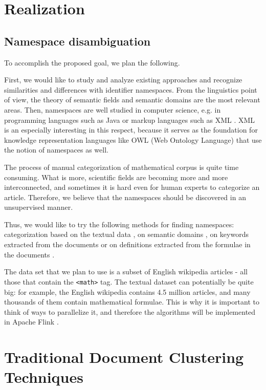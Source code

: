 

\section{Realization}
\subsection{Namespace disambiguation}

To accomplish the proposed goal, we plan the following.

First, we would like to study and analyze existing approaches and recognize similarities and differences with identifier namespaces. From the linguistics point of view, the theory of semantic fields \cite{vassilyev1974theory} and semantic domains \cite{gliozzo2009semantic} are the most relevant areas. Then, namespaces are well studied in computer science, e.g. in programming languages such as Java \cite{gosling2014java} or markup languages such as XML \cite{xmlnamespaces}. XML is an especially interesting in this respect, because it serves as the foundation for knowledge representation languages like OWL (Web Ontology Language) \cite{mcguinness2004owl} that use the notion of namespaces as well.

The process of manual categorization of mathematical corpus is quite time consuming. What is more, scientific fields are becoming more and more interconnected, and sometimes it is hard even for human experts to categorize an article. Therefore, we believe that the namespaces should be discovered in an unsupervised manner.

Thus, we would like to try the following methods for finding namespaces: categorization based on the textual data \cite{sebastiani2002machine}, on semantic domains \cite{gliozzo2009semantic}, on keywords extracted from the documents \cite{schoneberg2014pos} or on definitions extracted from the formulae in the documents \cite{pagael2014mlp}.

The data set that we plan to use is a subset of English wikipedia articles - all those that contain the \texttt{<math>} tag. The textual dataset can potentially be quite big: for example, the English wikipedia contains 4.5 million articles, and many thousands of them contain mathematical formulae. This is why it is important to think of ways to parallelize it, and therefore the algorithms will be implemented in Apache Flink \cite{source:flink}.



\section{Traditional Document Clustering Techniques}
